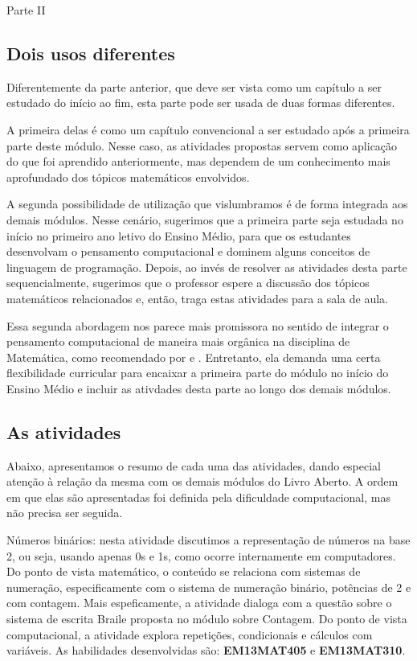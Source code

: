 \begin{paginatexto}{Parte II}
\subsection{Dois usos diferentes}

Diferentemente da parte anterior, que deve ser vista como um capítulo a ser estudado do início ao fim, esta parte pode ser usada de duas formas diferentes.

A primeira delas é como um capítulo convencional a ser estudado após a primeira parte deste módulo. Nesse caso, as atividades propostas servem como aplicação do que foi aprendido anteriormente, mas dependem de um conhecimento mais aprofundado dos tópicos matemáticos envolvidos.

A segunda possibilidade de utilização que vislumbramos é de forma integrada aos demais módulos. Nesse cenário, sugerimos que a primeira parte seja estudada no início no primeiro ano letivo do Ensino Médio, para que os estudantes desenvolvam o pensamento computacional e dominem alguns conceitos de linguagem de programação. Depois, ao invés de resolver as atividades desta parte sequencialmente, sugerimos que o professor espere a discussão dos tópicos matemáticos relacionados e, então, traga estas atividades para a sala de aula.

Essa segunda abordagem nos parece mais promissora no sentido de integrar o pensamento computacional de maneira mais orgânica na disciplina de Matemática, como recomendado por \citet{disessa2018} e \citet{li2020}. Entretanto, ela demanda uma certa flexibilidade curricular para encaixar a primeira parte do módulo no início do Ensino Médio e incluir as ativdades desta parte ao longo dos demais módulos.

\subsection{As atividades}
Abaixo, apresentamos o resumo de cada uma das atividades, dando especial atenção à relação da mesma com os demais módulos do Livro Aberto. A ordem em que elas são apresentadas foi definida pela dificuldade computacional, mas não precisa ser seguida.

Números binários: nesta atividade discutimos a representação de números na base 2, ou seja, usando apenas 0s e 1s, como ocorre internamente em computadores. Do ponto de vista matemático, o conteúdo se relaciona com sistemas de numeração, especificamente com o sistema de numeração binário, potências de 2 e com contagem. Mais espeficamente, a atividade dialoga com a questão sobre o sistema de escrita Braile proposta no módulo sobre Contagem. Do ponto de vista computacional, a atividade explora repetições, condicionais e cálculos com variáveis. As habilidades desenvolvidas são: \textbf{EM13MAT405} e \textbf{EM13MAT310}.


\end{paginatexto}
